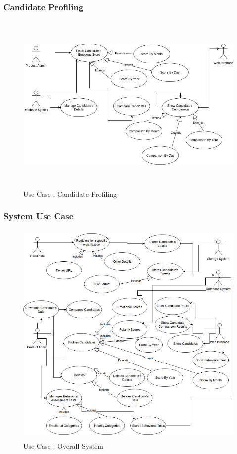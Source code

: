 \documentclass[oneside,a4paper,12pt]{pictreport}
\begin{document}
\subsubsection{Candidate Profiling}
\begin{figure}[h!]
\includegraphics[width=5.2in,height=3.5in]{UseCase4.jpg}
\caption{Use Case : Candidate Profiling}
\end{figure}
\newpage
\subsubsection{System Use Case}
\begin{figure}[h!]
\includegraphics[width=5.2in,height=4.4in]{SystemUseCase.jpg}
\caption{Use Case : Overall System}
\end{figure}
\newpage
\end{document}
